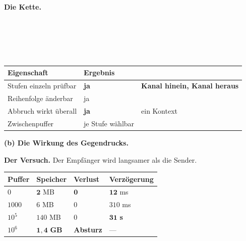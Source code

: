 \begin{aufgabe}
\textbf{Die Kette.}

\begin{center}
\begin{minipage}{0.86\textwidth}
\\
\\
\\
\\
\end{minipage}
\end{center}

\begin{center}
\renewcommand{\arraystretch}{1.45}
\begin{tabular}{@{}P{3.0cm}P{2.2cm}P{2.8cm}@{}}
\toprule
\textbf{Eigenschaft} & \textbf{Ergebnis} & \\
\midrule
Stufen einzeln prüfbar & \textcolor{gruen}{\textbf{ja}} & \textbf{Kanal hinein, Kanal heraus}\\
Reihenfolge änderbar & \textcolor{gruen}{ja} & \\
Abbruch wirkt überall & \textcolor{gruen}{\textbf{ja}} & \textcolor{gruen}{ein Kontext}\\
Zwischenpuffer & \textcolor{gruen}{je Stufe wählbar} & \\
\bottomrule
\end{tabular}
\end{center}

\begin{center}
\end{center}

\medskip
\textbf{(b) Die Wirkung des Gegendrucks.}

\textbf{Der Versuch.} Der Empfänger wird langsamer als die Sender.

\begin{center}
{\small
\renewcommand{\arraystretch}{1.45}
\begin{tabular}{@{}P{2.4cm}P{2.0cm}P{2.2cm}P{2.2cm}@{}}
\toprule
\textbf{Puffer} & \textbf{Speicher} & \textbf{Verlust} & \textbf{Verzögerung}\\
\midrule
$0$ & \textcolor{gruen}{$\mathbf{2}$ MB} & \textcolor{gruen}{$\mathbf{0}$} & \textcolor{gruen}{$\mathbf{12}$ ms}\\
$1000$ & $6$ MB & $0$ & $310$ ms\\
$10^5$ & \textcolor{akzent}{$140$ MB} & $0$ & \textcolor{akzent}{$\mathbf{31}$ \textbf{s}}\\
$10^6$ & \textcolor{akzent}{$\mathbf{1{,}4}$ \textbf{GB}} & \textcolor{akzent}{\textbf{Absturz}} & \textcolor{akzent}{---}\\
\bottomrule
\end{tabular}}
\end{center}


\end{aufgabe}
